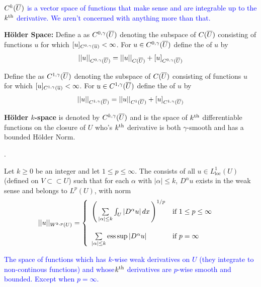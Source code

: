 \documentclass[12pt,a4paper]{report}
\newcommand{\BLUE}[1]{\textcolor{blue}{#1}}
\newcommand{\CSPACE}{{C(\CONJ{U})}}
\newcommand{\CNORM}[1]{|| #1 ||_\CSPACE}
\newcommand{\CSUBSPACE}[3]{C^{#1,#2}(#3)}
\newcommand{\HSPACE}[3]{C^{#1,#2}(#3)}
\newcommand{\HOLDERNORM}[4]{|| #4 ||_{\HSPACE{#1}{#2}{#3}}}
\newcommand{\HSEMINORM}[4]{[ #4 ]_{\HSPACE{#1}{#2}{#3}}}
\begin{document}
\begin{definition}
\begin{description}
\begin{description}
	\item \BLUE{$C^k(\overline{U})$ is a vector space of functions that make sense and are integrable up to the $k\textsuperscript{th}$ derivative.  We aren't concerned with anything more than that.
	}
	
\end{description}	 
	
	\item \textbf{H\"older Space:} Define a  as $\CSUBSPACE{0}{\gamma}{\CONJ{U}}$ denoting the subspace of $\CSPACE$ consisting of functions $u$ for which $\HSEMINORM{0}{\gamma}{\CONJ{u}}{u}<\infty$.  For $u \in \CSUBSPACE{0}{\gamma}{\CONJ{U}}$ define the  of $u$ by 
	\begin{align*}
		\HOLDERNORM{0}{\gamma}{\CONJ{U}}{u} = \CNORM{u}+\HSEMINORM{0}{\gamma}{\CONJ{U}}{u}
	\end{align*}
	
	Define the  as $\CSUBSPACE{1}{\gamma}{\CONJ{U}}$ denoting the subspace of $\CSPACE$ consisting of functions $u$ for which $\HSEMINORM{1}{\gamma}{\CONJ{u}}{u}<\infty$.  For $u \in \CSUBSPACE{1}{\gamma}{\CONJ{U}}$ define the  of $u$ by 
	\begin{align*}
		\HOLDERNORM{1}{\gamma}{\CONJ{U}}{u} = ||u||_{C^1(\CONJ{U})}+\HSEMINORM{1}{\gamma}{\CONJ{U}}{u}
	\end{align*}
	
	\item \textbf{H\"older $k$-space} is denoted by $\HSPACE{k}{\gamma}{\CONJ{U}}$ and is the space of $k\textsuperscript{th}$ differentiable functions on the closure of $U$ who's $k\textsuperscript{th}$ derivative is both $\gamma$-smooth and has a bounded H\"older Norm.
	

	\end{description}
	
\end{definition}

\HLINE

\newcommand{\SSPACE}[3]{{W^{#1,#2}(#3)}}
\begin{definition}.

Let $k \ge 0$ be an integer and let $1\le p \le \infty$.  The \DEFINE{Sobolev space $\SSPACE{k}{p}{U}$} consists of all $u \in L^1_{\text{loc}}(U)$ (defined on $V \subset\subset U$) such that for each $\alpha$ with $|\alpha|\le k$, $D^\alpha u$ exists in the weak sense and belongs to $L^p(U)$, with norm
\begin{align*}
	||u||_{\SSPACE{k}{p}{U}} &= \BINDEF{\PAREN{\SUM{|\alpha|\le k} {}\int_U |D^\alpha u|\, dx }^{1/p} & \text{if } 1\le p\le \infty \\ }{\SUM{|\alpha|\le k}{} \operatorname{ess}\sup|D^\alpha u| & \text{if }p = \infty}
\end{align*}

\BLUE{The space of functions which has $k$-wise weak derivatives on $U$ (they integrate to non-continous functions) and whose$k\textsuperscript{th}$ derivatives are $p$-wise  smooth and bounded.  Except when $p=\infty$.
}
\end{definition}
\end{document}
